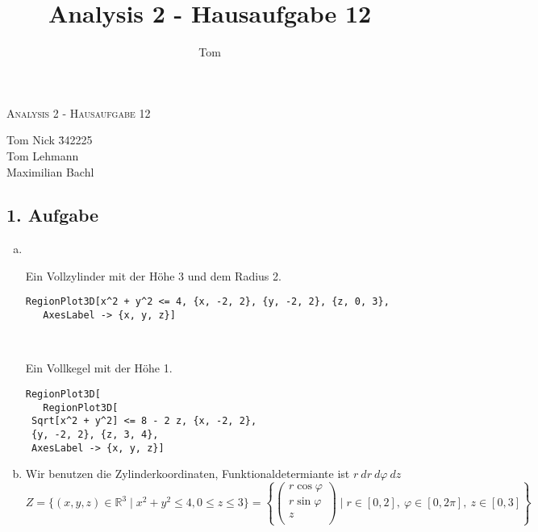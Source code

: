 \documentclass[10pt,a4paper,parskip=half]{scrartcl}
\author{Tom}
\title{Analysis 2 - Hausaufgabe 12}
\newcommand{\R}{\mathbb{R}}
\newcommand{\vecthree}[3]{\begin{pmatrix}#1\\#2\\#3\\\end {pmatrix}}
\begin{document}
\begin{center}
\textsc{\Large{Analysis 2 - Hausaufgabe 12}} \\
\end{center}
\begin{tabbing}
Tom Nick \hspace{1.4cm}\= 342225\\
Tom Lehmann\\
Maximilian Bachl
\end{tabbing}
\subsection*{1. Aufgabe}
\begin{enumerate}[(a)]
   \item \ \\
   \begin{minipage}{0.50\columnwidth}
   Ein Vollzylinder mit der Höhe 3 und dem Radius 2.
   \begin{lstlisting}[caption= Mathematica Code für die Menge Z]
   RegionPlot3D[x^2 + y^2 <= 4, {x, -2, 2}, {y, -2, 2}, {z, 0, 3}, 
   AxesLabel -> {x, y, z}]
   \end{lstlisting}
   \end{minipage}
   \begin{minipage}{0.50\columnwidth}
   \begin{center}
   \end{center}
   \end{minipage}
   \ \\
   \begin{minipage}{0.50\columnwidth}
   Ein Vollkegel mit der Höhe 1.
   \begin{lstlisting}[caption= Mathematica Code für die Menge K]
   RegionPlot3D[
   RegionPlot3D[
 Sqrt[x^2 + y^2] <= 8 - 2 z, {x, -2, 2}, 
 {y, -2, 2}, {z, 3, 4}, 
 AxesLabel -> {x, y, z}]
   \end{lstlisting}
   \end{minipage}
   \begin{minipage}{0.50\columnwidth}
   \begin{center}
   \end{center}
   \end{minipage}
   \item  
   Wir benutzen die Zylinderkoordinaten, Funktionaldetermiante ist $r~dr ~ d\varphi ~dz$
   \[ Z = \{ (x,y,z) \in \R^3  \mid x^2 + y^2 \le 4, 0 \le z \le 3\} = \left\{ \vecthree{r \cos \varphi}{r\sin \varphi}{z} \mid r \in [0,2] ,~ \varphi \in [0,2\pi], ~z \in [0,3] \right\} \] 

\end{enumerate}
\end{document}
